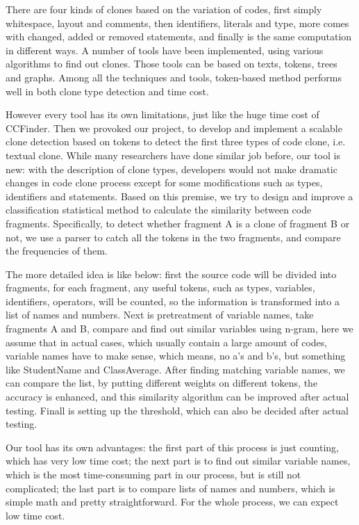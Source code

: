 \documentclass[conference]{IEEEtran}
\begin{document}
There are four kinds of clones based on the variation of codes, first simply whitespace, layout and comments, then identifiers, literals and type, more comes with changed, added or removed statements, and finally is the same computation in different ways.  
A number of tools have been implemented, using various algorithms to find out clones. Those tools can be based on texts, tokens, trees and graphs. Among all the techniques and tools, token-based method performs well in both clone type detection and time cost.

However every tool has its own limitations, just like the huge time cost of CCFinder. Then we provoked our project, to develop and implement a scalable clone detection based on tokens to detect the first three types of code clone, i.e. textual clone. 
While many researchers have done similar job before, our tool is new: with the description of clone types, developers would not make dramatic changes in code clone process except for some modifications such as types, identifiers and statements. 
Based on this premise, we try to design and improve a classification statistical method to calculate the similarity between code fragments. Specifically, to detect whether fragment A is a clone of fragment B or not, we use a parser to catch all the tokens in the two fragments, and compare the frequencies of them.

The more detailed idea is like below:
first the source code will be divided into fragments, for each fragment, any useful tokens, such as types, variables, identifiers, operators, will be counted, so the information is transformed into a list of names and numbers. 
Next is pretreatment of variable names, take fragments A and B, compare and find out similar variables using n-gram, here we assume that in actual cases, which usually contain a large amount of codes, variable names have to make sense, which means, no a's and b's, but something like StudentName and ClassAverage.
After finding matching variable names, we can compare the list, by putting different weights on different tokens, the accuracy is enhanced, and this similarity algorithm can be improved after actual testing.
Finall is setting up the threshold, which can also be decided after actual testing.

Our tool has its own advantages: the first part of this process is just counting, which has very low time cost; the next part is to find out similar variable names, which is the most time-consuming part in our process, but is still not complicated; the last part is to compare lists of names and numbers, which is simple math and pretty straightforward. For the whole process, we can expect low time cost.
\end{document}
